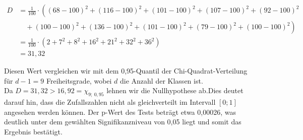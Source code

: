 \documentclass[main.tex]{subfiles}
\begin{document}
$$\begin{aligned}
	D &= \frac{1}{100} \cdot \left(
		(68 - 100)^2 +
		(116 - 100)^2 +
		(101 - 100)^2 +
		(107 - 100)^2 +
		(92 - 100)^2 \right. \\
		&\quad + \left.
		(100 - 100)^2 +
		(136 - 100)^2 +
		(101 - 100)^2 +
		(79 - 100)^2 +
		(100 - 100)^2 \right) \\
	&= \frac{1}{100} \cdot \left(
		2 +
		7^2 +
		8^2 +
		16^2 +
		21^2 +
		32^2 +
		36^2 \right)\\[2mm]
	&= 31,32
\end{aligned}$$

Diesen Wert vergleichen wir mit dem 0,95-Quantil der Chi-Quadrat-Verteilung für $d-1=9$ Freiheitsgrade, wobei $d$ die Anzahl der Klassen ist.\\

Da $D = 31,32 > 16,92 = \chi_{9;\ 0,95}$ lehnen wir die Nullhypothese ab.Dies deutet darauf hin, dass die Zufallszahlen nicht als gleichverteilt im Intervall $[0;1]$ angesehen werden können. Der p-Wert des Tests beträgt etwa 0,00026, was deutlich unter dem gewählten Signifikanzniveau von 0,05 liegt und somit das Ergebnis bestätigt.
\end{document}
